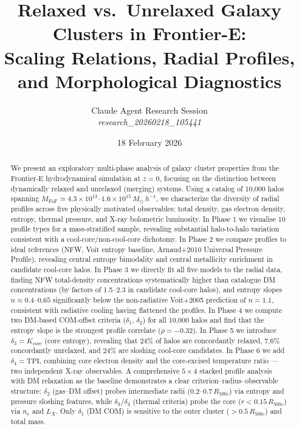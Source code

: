 \documentclass[12pt,a4paper]{article}
\title{\textbf{Relaxed vs.\ Unrelaxed Galaxy Clusters in Frontier-E:\\
Scaling Relations, Radial Profiles, and Morphological Diagnostics}}
\author{Claude Agent Research Session \\ \textit{research\_20260218\_105441}}
\date{18 February 2026}
\begin{document}
\maketitle

\begin{abstract}
We present an exploratory multi-phase analysis of galaxy cluster properties from the Frontier-E
hydrodynamical simulation at $z=0$, focusing on the distinction between dynamically
relaxed and unrelaxed (merging) systems. Using a catalog of 10,000 halos spanning
$M_\mathrm{FoF} \simeq 4.3\times10^{13}$--$1.6\times10^{15}\,M_\odot\,h^{-1}$,
we characterize the diversity of radial profiles across five physically motivated
observables: total density, gas electron density, entropy, thermal pressure, and
X-ray bolometric luminosity.
In Phase 1 we visualise 10 profile types for a mass-stratified sample, revealing
substantial halo-to-halo variation consistent with a cool-core/non-cool-core dichotomy.
In Phase 2 we compare profiles to ideal references (NFW, Voit entropy baseline, Arnaud+2010
Universal Pressure Profile), revealing central entropy bimodality and central metallicity
enrichment in candidate cool-core halos.
In Phase 3 we directly fit all five models to the radial data, finding NFW total-density
concentrations systematically higher than catalogue DM concentrations (by factors of
1.5--2.3 in candidate cool-core halos), and entropy slopes $n \approx 0.4$--$0.65$
significantly below the non-radiative Voit+2005 prediction of $n = 1.1$, consistent
with radiative cooling having flattened the profiles.
In Phase 4 we compute two DM-based COM-offset criteria ($\delta_1$, $\delta_2$) for all
10,000 halos and find that the entropy slope is the strongest profile correlate ($\rho=-0.32$).
In Phase 5 we introduce $\delta_3 = K_\mathrm{core}$ (core entropy), revealing that
$24\%$ of halos are concordantly relaxed, $7.6\%$ concordantly unrelaxed, and $24\%$
are sloshing cool-core candidates.
In Phase 6 we add $\delta_4 = \mathrm{TPI}$, combining core electron density and the
core-excised temperature ratio --- two independent X-ray observables. A comprehensive
$5\times4$ stacked profile analysis with DM relaxation as the baseline demonstrates a
clear criterion--radius--observable structure: $\delta_2$ (gas--DM offset) probes
intermediate radii ($0.2$--$0.7\,R_{500c}$) via entropy and pressure sloshing features,
while $\delta_3$/$\delta_4$ (thermal criteria) probe the core ($r<0.15\,R_{500c}$)
via $n_e$ and $L_X$. Only $\delta_1$ (DM COM) is sensitive to the outer cluster
($>0.5\,R_{500c}$) and total mass.
\end{abstract}
\end{document}
